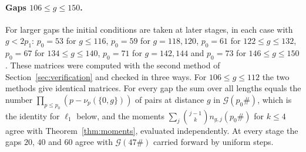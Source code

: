 \documentclass[11pt]{article}
\theoremstyle{definition}
\theoremstyle{remark}
\newcommand{\G}{\mathcal{G}}
\begin{document}
\paragraph{Gaps $106 \le g \le 150$.} For larger gaps the initial conditions are taken at later stages, in each case with $g < 2p_1$: $p_0 = 53$ for $g \le 116$, $p_0 = 59$ for $g = 118, 120$, $p_0 = 61$ for $122 \le g \le 132$, $p_0 = 67$ for $134 \le g \le 140$, $p_0 = 71$ for $g = 142, 144$ and $p_0 = 73$ for $146 \le g \le 150$. These matrices were computed with the second method of Section~\ref{sec:verification} and checked in three ways. For $106 \le g \le 112$ the two methods give identical matrices. For every gap the sum over all lengths equals the number $\prod_{p \le p_0} (p - \nu_p(\{0, g\}))$ of pairs at distance $g$ in $\G(p_0\#)$, which is the identity for $\ell_1$ below, and the moments $\sum_j \binom{j-1}{k} n_{g,j}(p_0\#)$ for $k \le 4$ agree with Theorem~\ref{thm:moments}, evaluated independently. At every stage the gaps $20$, $40$ and $60$ agree with $\G(47\#)$ carried forward by uniform steps.
\end{document}
